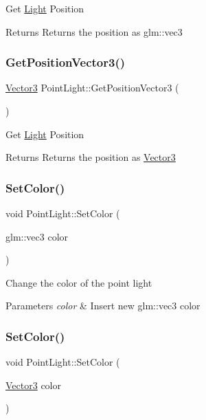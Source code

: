 Get \mbox{\hyperlink{class_light}{Light}} Position \begin{DoxyReturn}{Returns}
Returns the position as glm\+::vec3 
\end{DoxyReturn}
\mbox{\label{class_point_light_a13eb1498c87c75171311c9e87c8f1d01}} 
\subsubsection{\texorpdfstring{GetPositionVector3()}{GetPositionVector3()}}
{\footnotesize\ttfamily \mbox{\hyperlink{struct_vector3}{Vector3}} Point\+Light\+::\+Get\+Position\+Vector3 (\begin{DoxyParamCaption}{ }\end{DoxyParamCaption})}

Get \mbox{\hyperlink{class_light}{Light}} Position \begin{DoxyReturn}{Returns}
Returns the position as \mbox{\hyperlink{struct_vector3}{Vector3}} 
\end{DoxyReturn}
\mbox{\label{class_point_light_a13bb07ff4d5be58f18bc1530cf0e8abe}} 
\subsubsection{\texorpdfstring{SetColor()}{SetColor()}\hspace{0.1cm}{\footnotesize\ttfamily [1/2]}}
{\footnotesize\ttfamily void Point\+Light\+::\+Set\+Color (\begin{DoxyParamCaption}\item[{glm\+::vec3}]{color }\end{DoxyParamCaption})}

Change the color of the point light 
\begin{DoxyParams}{Parameters}
{\em color} & Insert new glm\+::vec3 color \\
\hline
\end{DoxyParams}
\mbox{\label{class_point_light_ae4d7fa67626719729b4ff66a265f0b0c}} 
\subsubsection{\texorpdfstring{SetColor()}{SetColor()}\hspace{0.1cm}{\footnotesize\ttfamily [2/2]}}
{\footnotesize\ttfamily void Point\+Light\+::\+Set\+Color (\begin{DoxyParamCaption}\item[{\mbox{\hyperlink{struct_vector3}{Vector3}}}]{color }\end{DoxyParamCaption})}

